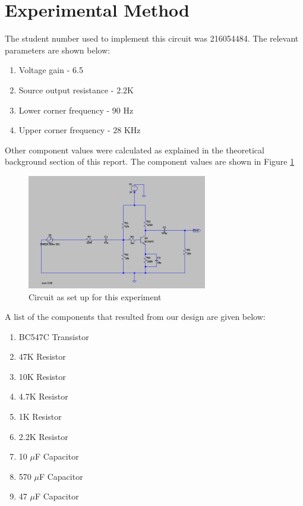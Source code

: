\documentclass[12pt, a4paper]{article}
\begin{document}
\begin{enumerate}
	\end{enumerate}


	

	\section{Experimental Method} %
	\label{sub:experimental_method}
	The student number used to implement this circuit was 216054484. The relevant parameters are shown below:
	\begin{enumerate}
		\item Voltage gain - 6.5
		\item Source output resistance - $2.2$K 
		\item Lower corner frequency - $90$ Hz
		\item Upper corner frequency - $28$ KHz
	\end{enumerate}
	Other component values were calculated as explained in the theoretical background section of this report. The component values are shown in Figure \ref{fig:lab_circuit}

	\begin{figure}[H]
		\centering
		\includegraphics[width=0.7\textwidth]{Images/lab_circuit.png}
		\caption{Circuit as set up for this experiment}
		\label{fig:lab_circuit}
	\end{figure}
	
	A list of the components that resulted from our design are given below:
	\begin{enumerate}
		\item BC547C Transistor
		\item 47K Resistor
		\item 10K Resistor
		\item 4.7K Resistor
		\item 1K Resistor
		\item 2.2K Resistor
		\item 10 $\mu$F Capacitor
		\item 570 $\mu$F Capacitor
		\item 47 $\mu$F Capacitor
	\end{enumerate}
\end{document}
